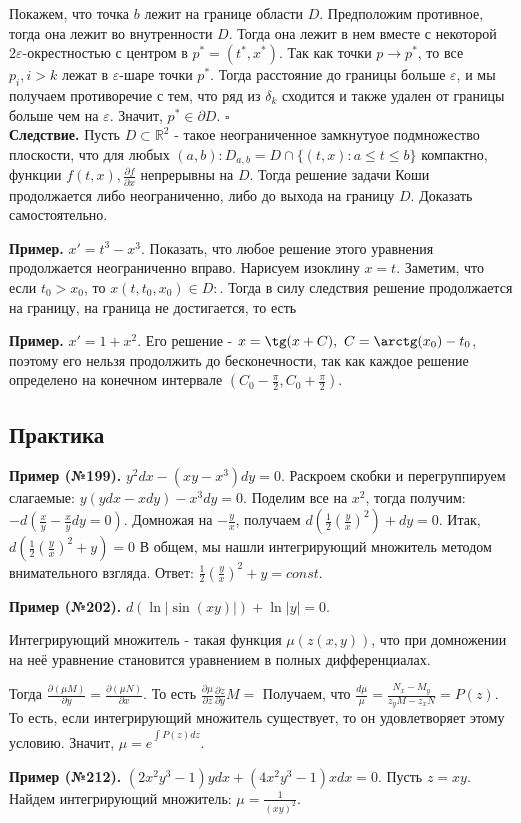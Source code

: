 Покажем, что точка $b$ лежит на границе области  $D$. Предположим противное,
тогда она лежит во внутренности $D$. Тогда она лежит в нем вместе
с некоторой $2\varepsilon$-окрестностью с центром в $p^*=(t^*,x^*)$.
Так как точки $p\to p^*$, то  все $p_i,i>k$ лежат в  $\varepsilon$-шаре
точки $p^*$. Тогда расстояние до границы больше  $\varepsilon$, 
и мы получаем противоречие с тем, что ряд из $\delta_k$ сходится и также
удален от границы больше чем на $\varepsilon$. Значит, $p^*\in \partial D$.
$\square$ \\
\textbf{Следствие.} Пусть $D\subset \mathbb{R}^2$ - такое неограниченное 
замкнутуое 
подмножество плоскости, что для любых $(a,b):D_{a,b}=D\cap \{
(t,x):a\leqslant t\leqslant b\}$ компактно, функции 
$f(t,x),\frac{\partial f}{\partial x}$ непрерывны на $D$. Тогда 
решение задачи Коши продолжается либо неограниченно, либо до выхода на границу
 $D$. Доказать самостоятельно. 

\textbf{Пример.} $x'=t^3-x^3$. Показать, что любое решение этого
уравнения продолжается неограниченно вправо.  Нарисуем изоклину $x=t$. 
Заметим, что если $t_0>x_0$, то $x(t,t_0,x_0)\in D:$. Тогда в силу следствия
решение продолжается на границу, на граница не достигается, то есть

\textbf{Пример.} $x'=1+x^2$. 
Его решение - $x=\tg(x+C),~C=\arctg(x_0)-t_0$, 
поэтому его нельзя продолжить до бесконечности,
так как каждое решение определено на конечном интервале $(C_0-\frac{\pi}{2},
C_0+\frac{\pi}{2})$. 

\subsection{Практика}

\textbf{Пример (№199).} $y^2dx-(xy-x^3)dy=0$. Раскроем скобки и перегруппируем
слагаемые: $y(ydx-xdy)-x^3dy=0$. Поделим все на  $x^2$, тогда получим:  
$-d\left( \frac{x}{y}-\frac{x}{y}dy=0 \right)$. Домножая на $- \frac{y}{x}$,
получаем $d\left( \frac{1}{2}\left( \frac{y}{x} \right)^2  \right) +dy=0$.
Итак, $d\left( \frac{1}{2}\left( \frac{y}{x} \right)^2 +y\right)=0$
В общем, мы нашли интегрирующий множитель методом внимательного взгляда. 
Ответ: $\frac{1}{2}\left( \frac{y}{x} \right)^2+y=const$.

\textbf{Пример (№202).} $d(\ln|\sin(xy)|)+\ln|y|=0$.

\begin{defin}
Интегрирующий множитель - такая функция $\mu(z(x,y))$, что при домножении на 
неё уравнение становится уравнением в полных дифференциалах.
\end{defin}
Тогда $\frac{\partial(\mu M)}{\partial y}=\frac{\partial(\mu N)}{\partial x}$.
То есть $\frac{\partial \mu}{\partial z}\frac{\partial z}{\partial y}M=
$
Получаем, что $\frac{d\mu}{\mu}= \frac{N_x-M_y}{z_yM-z_xN}=P(z)$. То есть, если
интегрирующий множитель существует, то он удовлетворяет этому условию. 
Значит, $\mu=e^{\int\limits_{}^{} P(z)dz}$.

\textbf{Пример (№212).} $(2x^2y^3-1)ydx+(4x^2y^3-1)xdx=0$.
Пусть $z=xy$. Найдем интегрирующий множитель: $\mu=\frac{1}{(xy)^2}$.


